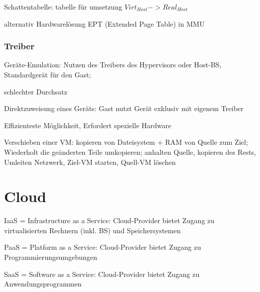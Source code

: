 Schattentabelle: tabelle für umsetzung $Virt_{Host} -> Real_{Host}$

alternativ Hardwarelösung EPT (Extended Page Table) in MMU

\subsubsection*{Treiber}
Geräte-Emulation: Nutzen des Treibers des Hypervisors oder Host-BS, Standardgerät für den Gast; 

schlechter Durchsatz

Direktzuweisung eines Geräts: Gast nutzt Gerät exklusiv mit eigenem Treiber

Effizienteste Möglichkeit, Erfordert spezielle Hardware


Verschieben einer VM: kopieren von Dateisystem + RAM von Quelle zum Ziel;
Wiederholt die geänderten Teile umkopieren; anhalten Quelle, kopieren des Rests, Umleiten Netzwerk, Ziel-VM starten, Quell-VM löschen

\section*{Cloud}
IaaS = Infrastructure as a Service: Cloud-Provider bietet Zugang zu virtualisierten Rechnern (inkl. BS)
und Speichersystemen

PaaS = Platform as a Service: Cloud-Provider bietet Zugang zu Programmierungsumgebungen

SaaS = Software as a Service: Cloud-Provider bietet Zugang zu Anwendungsprogrammen
